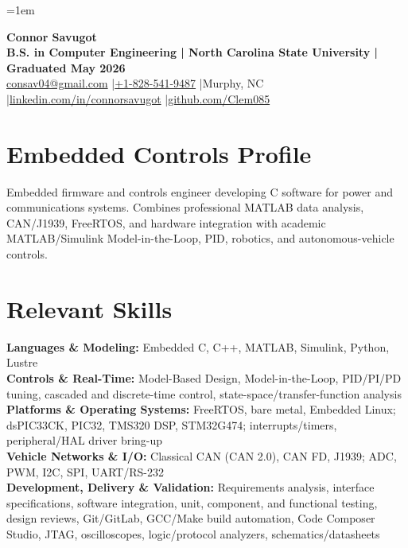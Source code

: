 \documentclass[10pt,letterpaper]{article}
\begin{document}
\fontsize{10.00}{11.00}\selectfont
\setlength{\RaggedRightRightskip}{0pt plus 5em}
\RaggedRight
\emergencystretch=1em

\begin{center}
  {\fontsize{21.5}{22.2}\selectfont\bfseries Connor Savugot}\\[1.5pt]
  {\bfseries B.S. in Computer Engineering | North Carolina State University | Graduated May 2026}\\[1.5pt]
  {\fontsize{9.6}{10.2}\selectfont
    \href{mailto:consav04@gmail.com}{consav04@gmail.com}
    \enspace|\enspace \href{tel:+18285419487}{+1-828-541-9487}
    \enspace|\enspace Murphy, NC
    \enspace|\enspace \href{https://linkedin.com/in/connorsavugot}{linkedin.com/in/connorsavugot}
    \enspace|\enspace \href{https://github.com/Clem085}{github.com/Clem085}}
\end{center}
\vspace{-0.18cm}

\section{Embedded Controls Profile}
Embedded firmware and controls engineer developing C software for power and communications systems. Combines professional MATLAB data analysis, CAN/J1939, FreeRTOS, and hardware integration with academic MATLAB/Simulink Model-in-the-Loop, PID, robotics, and autonomous-vehicle controls.

\section{Relevant Skills}
\textbf{Languages \& Modeling:} Embedded C, C++, MATLAB, Simulink, Python, Lustre\\
\textbf{Controls \& Real-Time:} Model-Based Design, Model-in-the-Loop, PID/PI/PD tuning, cascaded and discrete-time control, state-space/transfer-function analysis\\
\textbf{Platforms \& Operating Systems:} FreeRTOS, bare metal, Embedded Linux; dsPIC33CK, PIC32, TMS320 DSP, STM32G474; interrupts/timers, peripheral/HAL driver bring-up\\
\textbf{Vehicle Networks \& I/O:} Classical CAN (CAN 2.0), CAN FD, J1939; ADC, PWM, I2C, SPI, UART/RS-232\\
\textbf{Development, Delivery \& Validation:} Requirements analysis, interface specifications, software integration, unit, component, and functional testing, design reviews, Git/GitLab, GCC/Make build automation, Code Composer Studio, JTAG, oscilloscopes, logic/protocol analyzers, schematics/datasheets
\end{document}
